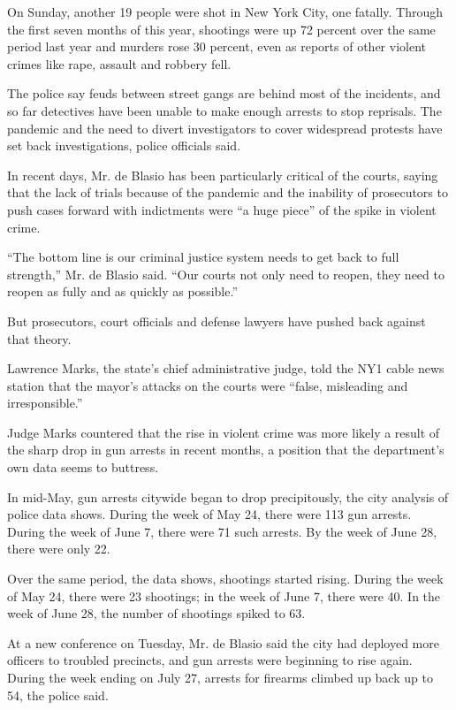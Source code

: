 On Sunday, another 19 people were shot in New York City, one fatally.
Through the first seven months of this year, shootings were up 72
percent over the same period last year and murders rose 30 percent, even
as reports of other violent crimes like rape, assault and robbery fell.

The police say feuds between street gangs are behind most of the
incidents, and so far detectives have been unable to make enough arrests
to stop reprisals. The pandemic and the need to divert investigators to
cover widespread protests have set back investigations, police officials
said.

In recent days, Mr. de Blasio has been particularly critical of the
courts, saying that the lack of trials because of the pandemic and the
inability of prosecutors to push cases forward with indictments were ``a
huge piece'' of the spike in violent crime.

``The bottom line is our criminal justice system needs to get back to
full strength,'' Mr. de Blasio said. ``Our courts not only need to
reopen, they need to reopen as fully and as quickly as possible.''

But prosecutors, court officials and defense lawyers have pushed back
against that theory.

Lawrence Marks, the state's chief administrative judge, told the NY1
cable news station that the mayor's attacks on the courts were ``false,
misleading and irresponsible.''

Judge Marks countered that the rise in violent crime was more likely a
result of the sharp drop in gun arrests in recent months, a position
that the department's own data seems to buttress.

In mid-May, gun arrests citywide began to drop precipitously, the city
analysis of police data shows. During the week of May 24, there were 113
gun arrests. During the week of June 7, there were 71 such arrests. By
the week of June 28, there were only 22.

Over the same period, the data shows, shootings started rising. During
the week of May 24, there were 23 shootings; in the week of June 7,
there were 40. In the week of June 28, the number of shootings spiked to
63.

At a new conference on Tuesday, Mr. de Blasio said the city had deployed
more officers to troubled precincts, and gun arrests were beginning to
rise again. During the week ending on July 27, arrests for firearms
climbed up back up to 54, the police said.

